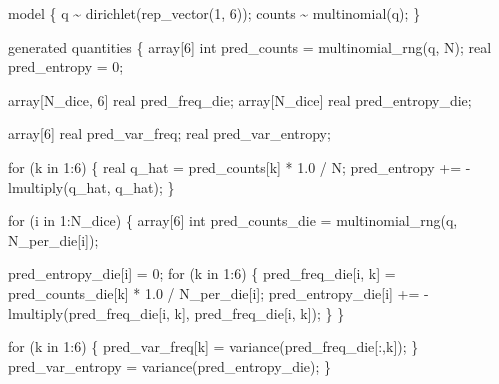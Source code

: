 \documentclass[
  letterpaper,
  DIV=11,
  numbers=noendperiod]{scrartcl}
\newenvironment{Shaded}{\begin{snugshade}}{\end{snugshade}}
\newcommand{\ControlFlowTok}[1]{\textcolor[rgb]{0.00,0.23,0.31}{#1}}
\newcommand{\DataTypeTok}[1]{\textcolor[rgb]{0.68,0.00,0.00}{#1}}
\newcommand{\DecValTok}[1]{\textcolor[rgb]{0.68,0.00,0.00}{#1}}
\newcommand{\FloatTok}[1]{\textcolor[rgb]{0.68,0.00,0.00}{#1}}
\newcommand{\KeywordTok}[1]{\textcolor[rgb]{0.00,0.23,0.31}{#1}}
\newcommand{\NormalTok}[1]{\textcolor[rgb]{0.00,0.23,0.31}{#1}}
\begin{document}
\begin{codelisting}
\begin{Shaded}
\begin{Highlighting}[]
\KeywordTok{model}\NormalTok{ \{}
\NormalTok{  q \textasciitilde{} dirichlet(rep\_vector(}\DecValTok{1}\NormalTok{, }\DecValTok{6}\NormalTok{));}
\NormalTok{  counts \textasciitilde{} multinomial(q);}
\NormalTok{\}}

\KeywordTok{generated quantities}\NormalTok{ \{}
  \DataTypeTok{array}\NormalTok{[}\DecValTok{6}\NormalTok{] }\DataTypeTok{int}\NormalTok{ pred\_counts = multinomial\_rng(q, N);}
  \DataTypeTok{real}\NormalTok{ pred\_entropy = }\DecValTok{0}\NormalTok{;}

  \DataTypeTok{array}\NormalTok{[N\_dice, }\DecValTok{6}\NormalTok{] }\DataTypeTok{real}\NormalTok{ pred\_freq\_die;}
  \DataTypeTok{array}\NormalTok{[N\_dice] }\DataTypeTok{real}\NormalTok{ pred\_entropy\_die;}

  \DataTypeTok{array}\NormalTok{[}\DecValTok{6}\NormalTok{] }\DataTypeTok{real}\NormalTok{ pred\_var\_freq;}
  \DataTypeTok{real}\NormalTok{ pred\_var\_entropy;}

  \ControlFlowTok{for}\NormalTok{ (k }\ControlFlowTok{in} \DecValTok{1}\NormalTok{:}\DecValTok{6}\NormalTok{) \{}
    \DataTypeTok{real}\NormalTok{ q\_hat = pred\_counts[k] * }\FloatTok{1.0}\NormalTok{ / N;}
\NormalTok{    pred\_entropy += {-} lmultiply(q\_hat, q\_hat);}
\NormalTok{  \}}

  \ControlFlowTok{for}\NormalTok{ (i }\ControlFlowTok{in} \DecValTok{1}\NormalTok{:N\_dice) \{}
    \DataTypeTok{array}\NormalTok{[}\DecValTok{6}\NormalTok{] }\DataTypeTok{int}\NormalTok{ pred\_counts\_die = multinomial\_rng(q, N\_per\_die[i]);}

\NormalTok{    pred\_entropy\_die[i] = }\DecValTok{0}\NormalTok{;}
    \ControlFlowTok{for}\NormalTok{ (k }\ControlFlowTok{in} \DecValTok{1}\NormalTok{:}\DecValTok{6}\NormalTok{) \{}
\NormalTok{      pred\_freq\_die[i, k] = pred\_counts\_die[k] * }\FloatTok{1.0}\NormalTok{ / N\_per\_die[i];}
\NormalTok{      pred\_entropy\_die[i] += {-} lmultiply(pred\_freq\_die[i, k],}
\NormalTok{                                         pred\_freq\_die[i, k]);}
\NormalTok{    \}}
\NormalTok{  \}}

  \ControlFlowTok{for}\NormalTok{ (k }\ControlFlowTok{in} \DecValTok{1}\NormalTok{:}\DecValTok{6}\NormalTok{) \{}
\NormalTok{    pred\_var\_freq[k] = variance(pred\_freq\_die[:,k]);}
\NormalTok{  \}}
\NormalTok{  pred\_var\_entropy = variance(pred\_entropy\_die);}
\NormalTok{\}}
\end{Highlighting}
\end{Shaded}

\end{codelisting}
\end{document}
